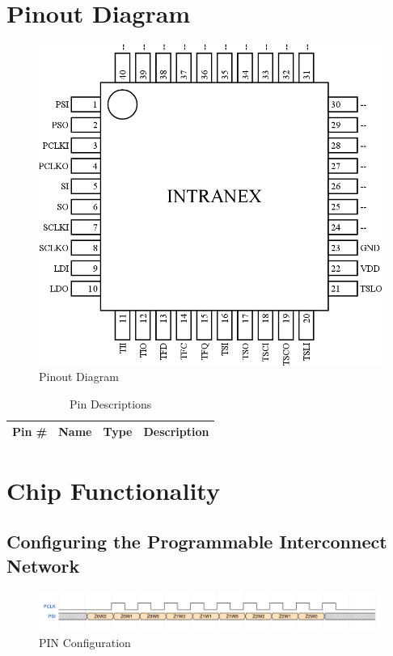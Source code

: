\documentclass{article}
\begin{document}

\newpage
\tableofcontents
\newpage
\listoffigures
\listoftables
\lstlistoflistings
\newpage
\section{Pinout Diagram}

\begin{figure}[H]
    \centering
    \includegraphics[width=\linewidth]{../pinout/pinout.png}
    \caption{Pinout Diagram}
\end{figure}

\begin{table}[H]
    \begin{tabularx}{\textwidth}{|l|l|c|X|}
        \hline
        \textbf{Pin \#} & \textbf{Name} & \textbf{Type} & \textbf{Description} \\
        \hline
        
    \end{tabularx}
    \caption{Pin Descriptions}
\end{table}

\newpage
\section{Chip Functionality}

\subsection{Configuring the Programmable Interconnect Network}
\begin{figure}[H]
    \centering
    \includegraphics[width=\linewidth]{../waveforms/pin.png}
    \caption{PIN Configuration}
\end{figure}
\end{document}
